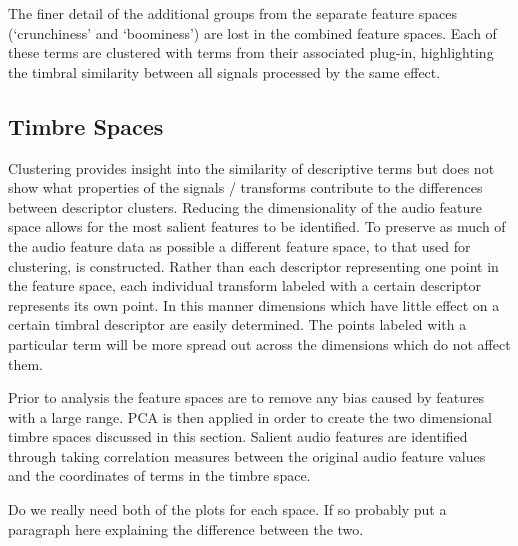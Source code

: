		The finer detail of the additional groups from the separate feature spaces (`crunchiness' and `boominess')
		are lost in the combined feature spaces. Each of these terms are clustered with terms from their associated
		plug-in, highlighting the timbral similarity between all signals processed by the same effect.

	\subsection{Timbre Spaces}
	\label{sec:TimbreEvaluation-Analysis-TimbreSpaces}
		Clustering provides insight into the similarity of descriptive terms but does not show what properties of
		the signals / transforms contribute to the differences between descriptor clusters. Reducing the
		dimensionality of the audio feature space allows for the most salient features to be identified. To
		preserve as much of the audio feature data as possible a different feature space, to that used for
		clustering, is constructed. Rather than each descriptor representing one point in the feature space, each
		individual transform labeled with a certain descriptor represents its own point. In this manner dimensions
		which have little effect on a certain timbral descriptor are easily determined. The points labeled with a
		particular term will be more spread out across the dimensions which do not affect them. 
		
		Prior to analysis the feature spaces are to remove any bias caused by features with a large range. PCA is
		then applied in order to create the two dimensional timbre spaces discussed in this section.  Salient audio
		features are identified through taking correlation measures between the original audio feature values and
		the coordinates of terms in the timbre space.

		\note
		{
			Do we really need both of the plots for each space. If so probably put a paragraph here explaining
			the difference between the two.
		}

